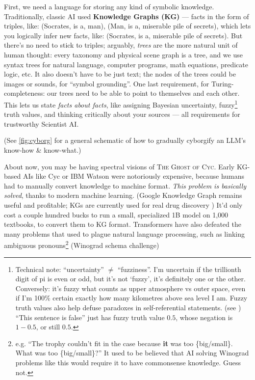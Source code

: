 \documentclass[11pt]{article}
\begin{document}
First, we need a language for storing any kind of symbolic knowledge. Traditionally, classic AI used \textbf{Knowledge Graphs (KG)} — facts in the form of triples, like: (Socrates, is a, man), (Man, is a, miserable pile of secrets), which lets you logically infer new facts, like: (Socrates, is a, miserable pile of secrets). But there's no need to stick to triples; arguably, \textit{trees} are the more natural unit of human thought: every taxonomy and physical scene graph is a tree, and we use syntax trees for natural language, computer programs, math equations, predicate logic, etc. It also doesn't have to be just text; the nodes of the trees could be images or sounds, for ``symbol grounding''. One last requirement, for Turing-completeness: our trees need to be able to point to themselves and each other. This lets us state \textit{facts about facts}, like assigning Bayesian uncertainty, fuzzy\footnote{Technical note: ``uncertainty'' $\neq$ ``fuzziness''. I'm uncertain if the trillionth digit of pi is even or odd, but it's not `fuzzy', it's definitely one or the other. Conversely: it's fuzzy what counts as upper atmosphere vs outer space, even if I'm 100\% certain exactly how many kilometres above sea level I am. Fuzzy truth values also help defuse paradoxes in self-referential statements. (see \citep{saving_truth_from_paradox}) ``This sentence is false'' just has fuzzy truth value $0.5$, whose negation is $1 - 0.5$, or still $0.5$.} truth values, and thinking critically about your sources — all requirements for trustworthy Scientist AI.

(See \autoref{fig:cyborg} for a general schematic of how to gradually cyborgify an LLM's know-how \& know-what.)

About now, you may be having spectral visions of \textsc{The Ghost of Cyc}. Early KG-based AIs like Cyc or IBM Watson were notoriously expensive, because humans had to manually convert knowledge to machine format. \textit{This problem is basically solved}, thanks to modern machine learning. (Google Knowledge Graph remains useful and profitable; KGs are currently used for real drug discovery \citep{baricitinib_kg}) It'd only cost a couple hundred bucks to run a small, specialized 1B model on 1,000 textbooks, to convert them to KG format. Transformers have also defeated the many problems that used to plague natural language processing, such as linking ambiguous pronouns\footnote{e.g. ``The trophy couldn't fit in the case because \textbf{it} was too \{big/small\}. What was too \{big/small\}?'' It used to be believed that AI solving Winograd problems like this would require it to have commonsense knowledge. Guess not.} (Winograd schema challenge) \citep{winograd_schema,winograd_defeat}
\end{document}
